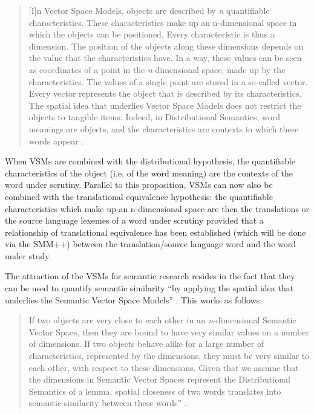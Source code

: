 \begin{quote}
[I]n Vector Space Models, objects are described by \textit{n} quantifiable characteristics. These characteristics make up an n{}-dimensional space in which the objects can be positioned. Every characteristic is thus a dimension. The position of the objects along these dimensions depends on the value that the characteristics have. In a way, these values can be seen as coordinates of a point in the \textit{n}{}-dimensional space, made up by the characteristics. The values of a single point are stored in a so-called vector. Every vector represents the object that is described by its characteristics. The spatial idea that underlies Vector Space Models does not restrict the objects to tangible items. Indeed, in Distributional Semantics, word meanings are objects, and the characteristics are contexts in which these words appear \citep[212]{szmrecsanyi_semantic_2014}.
\end{quote}

When VSMs are combined with the distributional hypothesis, the quantifiable characteristics of the object (i.e. of the word meaning) are the contexts of the word under scrutiny. Parallel to this proposition, VSMs can now also be combined with the translational equivalence hypothesis: the quantifiable characteristics which make up an n-dimensional space are then the translations or the source language lexemes of a word under scrutiny provided that a relationship of translational equivalence has been established (which will be done via the SMM++) between the translation/source language word and the word under study.

The attraction of the VSMs for semantic research resides in the fact that they can be used to quantify semantic similarity “by applying the spatial idea that underlies the Semantic Vector Space Models” \citep[213]{szmrecsanyi_semantic_2014}. This works as follows:

\begin{quote}
If two objects are very close to each other in an \textit{n}{}-dimensional Semantic Vector Space, then they are bound to have very similar values on a number of dimensions. If two objects behave alike for a large number of characteristics, represented by the dimensions, they must be very similar to each other, with respect to these dimensions. Given that we assume that the dimensions in Semantic Vector Spaces represent the Distributional Semantics of a lemma, spatial closeness of two words translates into semantic similarity between these words” \citep[213]{szmrecsanyi_semantic_2014}.
\end{quote}

